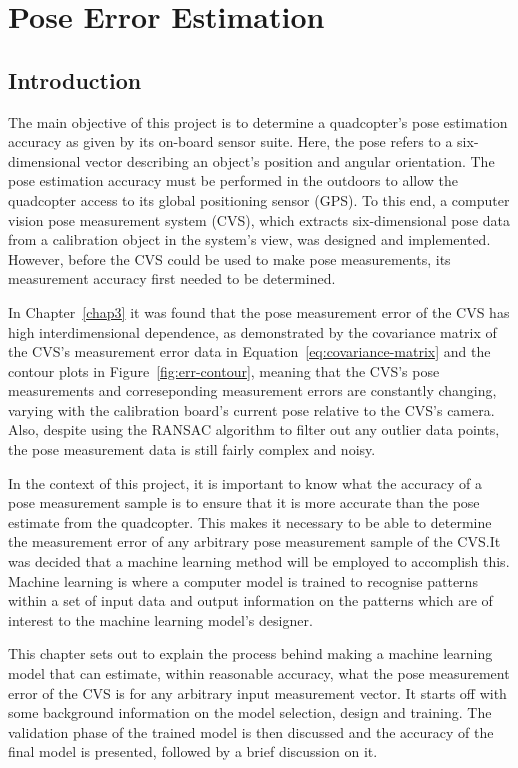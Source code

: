 \chapter{Pose Error Estimation}
\label{chap4}

\section{Introduction}

The main objective of this project is to determine a quadcopter's pose estimation accuracy as given by its on-board sensor suite. Here, the pose refers to a six-dimensional vector describing an object's position and angular orientation. The pose estimation accuracy must be performed in the outdoors to allow the quadcopter access to its global positioning sensor (GPS). To this end, a computer vision pose measurement system (CVS), which extracts six-dimensional pose data from a calibration object in the system's view, was designed and implemented. However, before the CVS could be used to make pose measurements, its measurement accuracy first needed to be determined. 

In Chapter~\ref{chap3} it was found that the pose measurement error of the CVS has high interdimensional dependence, as demonstrated by the covariance matrix of the CVS's measurement error data in Equation~\ref{eq:covariance-matrix} and the contour plots in Figure~\ref{fig:err-contour}, meaning that the CVS's pose measurements and correseponding measurement errors are constantly changing, varying with the calibration board's current pose relative to the CVS's camera. Also, despite using the RANSAC algorithm to filter out any outlier data points, the pose measurement data is still fairly complex and noisy.

In the context of this project, it is important to know what the accuracy of a pose measurement sample is to ensure that it is more accurate than the pose estimate from the quadcopter. This makes it necessary to be able to determine the measurement error of any arbitrary pose measurement sample of the CVS.\@ It was decided that a machine learning method will be employed to accomplish this. Machine learning is where a computer model is trained to recognise patterns within a set of input data and output information on the patterns which are of interest to the machine learning model's designer. 

This chapter sets out to explain the process behind making a machine learning model that can estimate, within reasonable accuracy, what the pose measurement error of the CVS is for any arbitrary input measurement vector. It starts off with some background information on the model selection, design and training. The validation phase of the trained model is then discussed and the accuracy of the final model is presented, followed by a brief discussion on it. 


